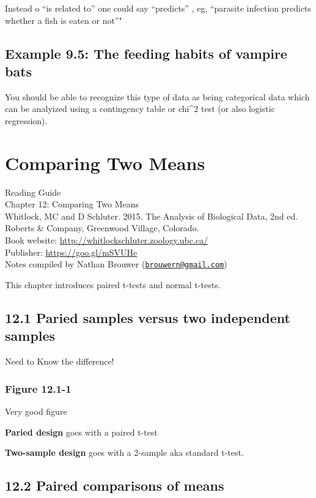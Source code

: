 \documentclass[]{book}
\theoremstyle{definition}
\theoremstyle{definition}
\theoremstyle{definition}
\theoremstyle{remark}
\begin{document}
Instead o ``is related to'' one could say ``predicts'' , eg, ``parasite
infection predicts whether a fish is eaten or not''"

\subsection{Example 9.5: The feeding habits of vampire
bats}\label{example-9.5-the-feeding-habits-of-vampire-bats}

You should be able to recognize this type of data as being categorical
data which can be analyized using a contingency table or chi\^{}2 test
(or also logistic regression).

\section{Comparing Two Means}\label{comparing-two-means}

Reading Guide\\
Chapter 12: Comparing Two Means\\
Whitlock, MC and D Schluter. 2015. The Analysis of Biological Data, 2nd
ed. Roberts \& Company, Greenwood Village, Colorado.\\
Book website: \url{http://whitlockschluter.zoology.ubc.ca/}\\
Publisher: \url{https://goo.gl/mSVUHe}\\
Notes compiled by Nathan Brouwer
(\href{mailto:brouwern@gmail.com}{\nolinkurl{brouwern@gmail.com}})

This chapter introduces paired t-tests and normal t-tests.

\subsection{12.1 Paried samples versus two independent
samples}\label{paried-samples-versus-two-independent-samples}

Need to Know the difference!

\subsubsection{Figure 12.1-1}\label{figure-12.1-1}

Very good figure

\textbf{Paried design} goes with a paired t-test

\textbf{Two-sample design} goes with a 2-sample aka standard t-test.

\subsection{12.2 Paired comparisons of
means}\label{paired-comparisons-of-means}
\end{document}

